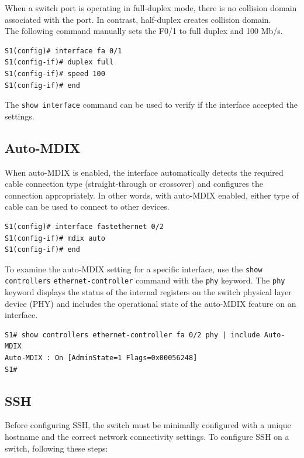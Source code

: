 When a switch port is operating in full-duplex mode, there is no collision domain associated with the port. In contrast, half-duplex creates collision domain.\\

The following command manually sets the F0/1 to full duplex and 100 Mb/s.

\begin{verbatim}
S1(config)# interface fa 0/1
S1(config-if)# duplex full
S1(config-if)# speed 100
S1(config-if)# end
\end{verbatim}

The \verb|show interface| command can be used to verify if the interface accepted the settings.

\subsection{Auto-MDIX}

When auto-MDIX is enabled, the interface automatically detects the required cable connection type (straight-through or crossover) and configures the connection appropriately. In other words, with auto-MDIX enabled, either type of cable can be used to connect to other devices.

\begin{verbatim}
S1(config)# interface fastethernet 0/2
S1(config-if)# mdix auto
S1(config-if)# end
\end{verbatim}

To examine the auto-MDIX setting for a specific interface, use the \verb|show controllers| \verb|ethernet-controller| command with the \verb|phy| keyword. The \verb|phy| keyword displays the status of the internal registers on the switch physical layer device (PHY) and includes the operational state of the auto-MDIX feature on an interface. 

\begin{verbatim}
S1# show controllers ethernet-controller fa 0/2 phy | include Auto-MDIX
Auto-MDIX : On [AdminState=1 Flags=0x00056248]
S1#
\end{verbatim}


\subsection{SSH}

Before configuring SSH, the switch must be minimally configured with a unique hostname and the correct network connectivity settings. To configure SSH on a switch, following these steps:

